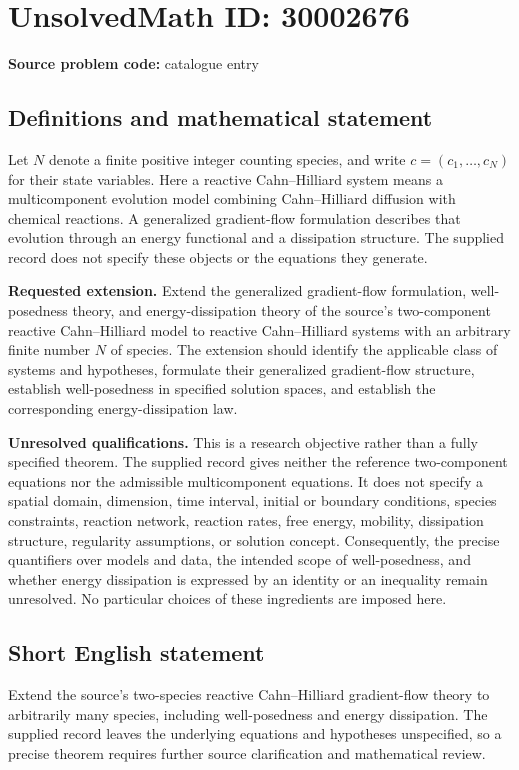 \documentclass[11pt]{article}
\begin{document}
\section*{UnsolvedMath ID: 30002676}
\textbf{Source problem code:} catalogue entry
\subsection{Definitions and mathematical statement}
Let \(N\) denote a finite positive integer counting species, and write \(c=(c_1,\ldots,c_N)\) for their state variables. Here a reactive Cahn--Hilliard system means a multicomponent evolution model combining Cahn--Hilliard diffusion with chemical reactions. A generalized gradient-flow formulation describes that evolution through an energy functional and a dissipation structure. The supplied record does not specify these objects or the equations they generate.

\textbf{Requested extension.} Extend the generalized gradient-flow formulation, well-posedness theory, and energy-dissipation theory of the source's two-component reactive Cahn--Hilliard model to reactive Cahn--Hilliard systems with an arbitrary finite number \(N\) of species. The extension should identify the applicable class of systems and hypotheses, formulate their generalized gradient-flow structure, establish well-posedness in specified solution spaces, and establish the corresponding energy-dissipation law.

\textbf{Unresolved qualifications.} This is a research objective rather than a fully specified theorem. The supplied record gives neither the reference two-component equations nor the admissible multicomponent equations. It does not specify a spatial domain, dimension, time interval, initial or boundary conditions, species constraints, reaction network, reaction rates, free energy, mobility, dissipation structure, regularity assumptions, or solution concept. Consequently, the precise quantifiers over models and data, the intended scope of well-posedness, and whether energy dissipation is expressed by an identity or an inequality remain unresolved. No particular choices of these ingredients are imposed here.
\subsection{Short English statement}
Extend the source's two-species reactive Cahn--Hilliard gradient-flow theory to arbitrarily many species, including well-posedness and energy dissipation. The supplied record leaves the underlying equations and hypotheses unspecified, so a precise theorem requires further source clarification and mathematical review.
\end{document}
